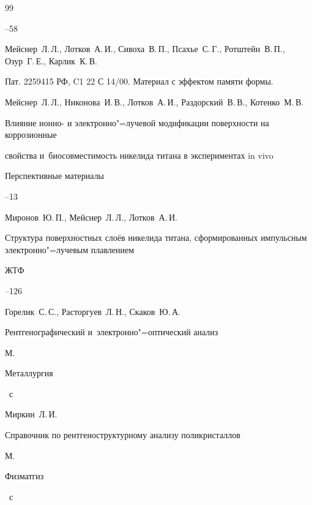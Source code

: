 \begin{thebibliography}{99}


--58








\by Мейснер~Л.\,Л., Лотков~А.\,И., Сивоха~В.\,П., Псахье~С.\,Г., Ротштейн~В.\,П., Озур~Г.\,Е., Карлик~К.\,В.

\book Пат. 2259415 РФ, C1 22 С 14/00. Материал с эффектом памяти формы.




\by Мейснер~Л.\,Л., Никонова~И.\,В., Лотков~А.\,И., Раздорский~В.\,В., Котенко~М.\,В.

\paper Влияние ионно- и электронно"=лучевой модификации поверхности на коррозионные

свойства и~биосовместимость никелида титана в экспериментах in vivo

\jour Перспективные материалы



--13




\by Миронов~Ю.\,П., Мейснер~Л.\,Л., Лотков~А.\,И.

\paper Структура поверхностных слоёв никелида титана, сформированных импульсным электронно"=лучевым плавлением

\jour   ЖТФ




--126




\by Горелик~С.\,С., Расторгуев~Л.\,Н., Скаков~Ю.\,А.

\book Рентгенографический и~электронно"=оптический анализ

\publaddr М.

\publ Металлургия


~с




\by Миркин~Л.\,И.

\book Справочник по рентгеноструктурному анализу поликристаллов

\publaddr М.

\publ Физматгиз


~с

\end{thebibliography}





